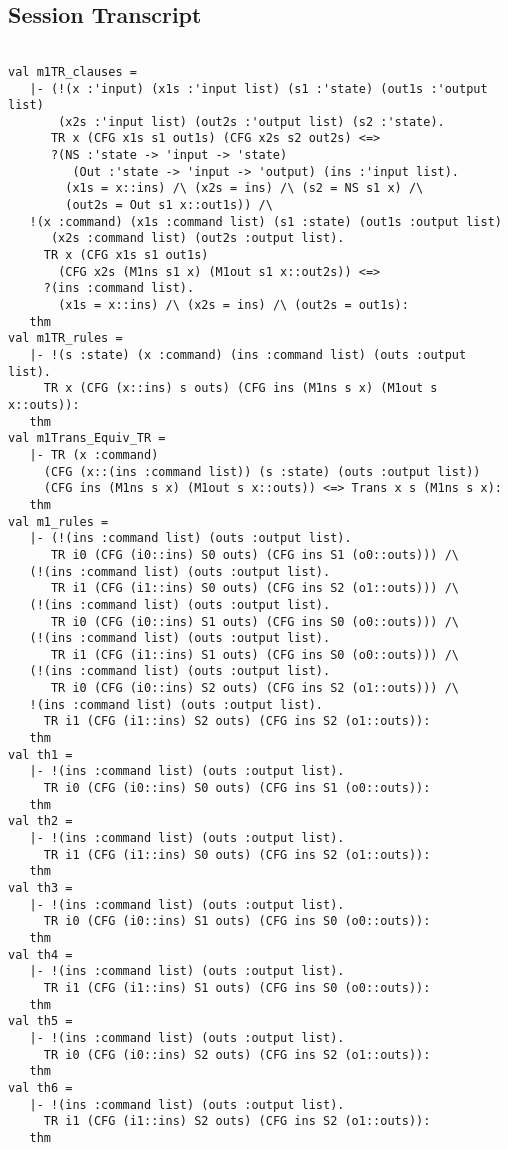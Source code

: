\documentclass{report}
\begin{document}
\subsection{Session Transcript}
\label{trans3}
\begin{session}
  \begin{scriptsize}
\begin{verbatim}

val m1TR_clauses =
   |- (!(x :'input) (x1s :'input list) (s1 :'state) (out1s :'output list)
       (x2s :'input list) (out2s :'output list) (s2 :'state).
      TR x (CFG x1s s1 out1s) (CFG x2s s2 out2s) <=>
      ?(NS :'state -> 'input -> 'state)
         (Out :'state -> 'input -> 'output) (ins :'input list).
        (x1s = x::ins) /\ (x2s = ins) /\ (s2 = NS s1 x) /\
        (out2s = Out s1 x::out1s)) /\
   !(x :command) (x1s :command list) (s1 :state) (out1s :output list)
      (x2s :command list) (out2s :output list).
     TR x (CFG x1s s1 out1s)
       (CFG x2s (M1ns s1 x) (M1out s1 x::out2s)) <=>
     ?(ins :command list).
       (x1s = x::ins) /\ (x2s = ins) /\ (out2s = out1s):
   thm
val m1TR_rules =
   |- !(s :state) (x :command) (ins :command list) (outs :output list).
     TR x (CFG (x::ins) s outs) (CFG ins (M1ns s x) (M1out s x::outs)):
   thm
val m1Trans_Equiv_TR =
   |- TR (x :command)
     (CFG (x::(ins :command list)) (s :state) (outs :output list))
     (CFG ins (M1ns s x) (M1out s x::outs)) <=> Trans x s (M1ns s x):
   thm
val m1_rules =
   |- (!(ins :command list) (outs :output list).
      TR i0 (CFG (i0::ins) S0 outs) (CFG ins S1 (o0::outs))) /\
   (!(ins :command list) (outs :output list).
      TR i1 (CFG (i1::ins) S0 outs) (CFG ins S2 (o1::outs))) /\
   (!(ins :command list) (outs :output list).
      TR i0 (CFG (i0::ins) S1 outs) (CFG ins S0 (o0::outs))) /\
   (!(ins :command list) (outs :output list).
      TR i1 (CFG (i1::ins) S1 outs) (CFG ins S0 (o0::outs))) /\
   (!(ins :command list) (outs :output list).
      TR i0 (CFG (i0::ins) S2 outs) (CFG ins S2 (o1::outs))) /\
   !(ins :command list) (outs :output list).
     TR i1 (CFG (i1::ins) S2 outs) (CFG ins S2 (o1::outs)):
   thm
val th1 =
   |- !(ins :command list) (outs :output list).
     TR i0 (CFG (i0::ins) S0 outs) (CFG ins S1 (o0::outs)):
   thm
val th2 =
   |- !(ins :command list) (outs :output list).
     TR i1 (CFG (i1::ins) S0 outs) (CFG ins S2 (o1::outs)):
   thm
val th3 =
   |- !(ins :command list) (outs :output list).
     TR i0 (CFG (i0::ins) S1 outs) (CFG ins S0 (o0::outs)):
   thm
val th4 =
   |- !(ins :command list) (outs :output list).
     TR i1 (CFG (i1::ins) S1 outs) (CFG ins S0 (o0::outs)):
   thm
val th5 =
   |- !(ins :command list) (outs :output list).
     TR i0 (CFG (i0::ins) S2 outs) (CFG ins S2 (o1::outs)):
   thm
val th6 =
   |- !(ins :command list) (outs :output list).
     TR i1 (CFG (i1::ins) S2 outs) (CFG ins S2 (o1::outs)):
   thm

\end{verbatim}
  \end{scriptsize}
\end{session}
\end{document}
